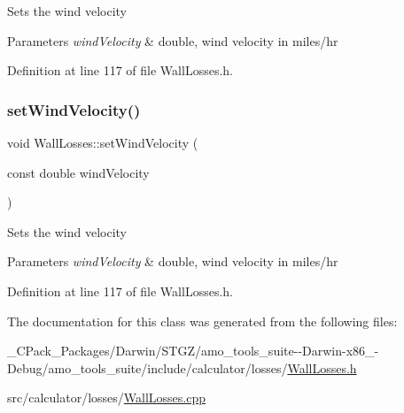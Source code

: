 Sets the wind velocity 
\begin{DoxyParams}{Parameters}
{\em wind\+Velocity} & double, wind velocity in miles/hr \\
\hline
\end{DoxyParams}


Definition at line 117 of file Wall\+Losses.\+h.

\mbox{\label{class_wall_losses_ae376b7ce4e5b3c45a663395802c176a9}} 
\subsubsection{\texorpdfstring{set\+Wind\+Velocity()}{setWindVelocity()}\hspace{0.1cm}{\footnotesize\ttfamily [3/3]}}
{\footnotesize\ttfamily void Wall\+Losses\+::set\+Wind\+Velocity (\begin{DoxyParamCaption}\item[{const double}]{wind\+Velocity }\end{DoxyParamCaption})\hspace{0.3cm}{\ttfamily [inline]}}

Sets the wind velocity 
\begin{DoxyParams}{Parameters}
{\em wind\+Velocity} & double, wind velocity in miles/hr \\
\hline
\end{DoxyParams}


Definition at line 117 of file Wall\+Losses.\+h.



The documentation for this class was generated from the following files\+:\begin{DoxyCompactItemize}
\item 
\+\_\+\+C\+Pack\+\_\+\+Packages/\+Darwin/\+S\+T\+G\+Z/amo\+\_\+tools\+\_\+suite-\/-\/\+Darwin-\/x86\+\_-\/\+Debug/amo\+\_\+tools\+\_\+suite/include/calculator/losses/\hyperlink{___c_pack___packages_2_darwin_2_s_t_g_z_2amo__tools__suite--_darwin-x86__64-_debug_2amo__tools__72cbdaf3bb3033fbed78fcaa88f15f6f}{Wall\+Losses.\+h}\item 
src/calculator/losses/\hyperlink{_wall_losses_8cpp}{Wall\+Losses.\+cpp}\end{DoxyCompactItemize}
